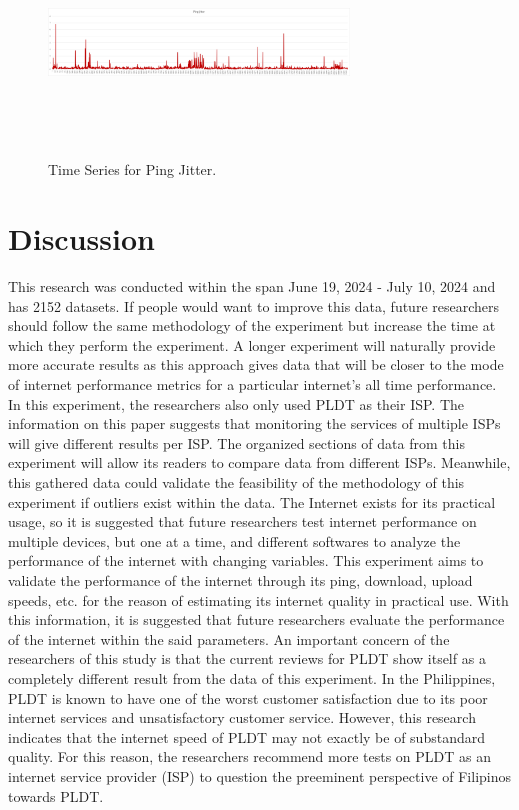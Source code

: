 \documentclass[conference]{IEEEtran}
\begin{document}
\begin{figure}[!htbp]
    \centerline{\includegraphics[width=8cm,height=6cm,keepaspectratio]{Figures/Picture8.png}}
    \caption{Time Series for Ping Jitter.}
    \label{fig6}
\end{figure}

\newpage

\section{Discussion}
This research was conducted within the span June 19, 2024 - July 10, 2024 and has 2152 datasets. If people would want to improve this data, future researchers should follow the same methodology of the experiment but increase the time at which they perform the experiment. A longer experiment will naturally provide more accurate results as this approach gives data that will be closer to the mode of internet performance metrics for a particular internet's all time performance. 
In this experiment, the researchers also only used PLDT as their ISP. The information on this paper suggests that monitoring the services of multiple ISPs will give different results per ISP. The organized sections of data from this experiment will allow its readers to compare data from different ISPs. Meanwhile, this gathered data could validate the feasibility of the methodology of this experiment if outliers exist within the data. 
The Internet exists for its practical usage, so it is suggested that future researchers test internet performance on multiple devices, but one at a time, and different softwares to analyze the performance of the internet with changing variables. This experiment aims to validate the performance of the internet through its ping, download, upload speeds, etc. for the reason of estimating its internet quality in practical use. With this information, it is suggested that future researchers evaluate the performance of the internet within the said parameters.
An important concern of the researchers of this study is that the current reviews for PLDT show itself as a completely different result from the data of this experiment. In the Philippines, PLDT is known to have one of the worst customer satisfaction due to its poor internet services and unsatisfactory customer service. However, this research indicates that the internet speed of PLDT may not exactly be of substandard quality. For this reason, the researchers recommend more tests on PLDT as an internet service provider (ISP) to question the preeminent perspective of Filipinos towards PLDT.
\end{document}
